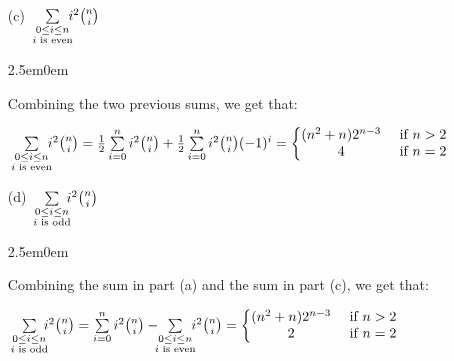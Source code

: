 \documentclass{book}
\newcommand{\exOne}{%
   \color{Purple}%
   \fontsize{13}{15}\selectfont%
}
\newenvironment{myIndent}{%
   \begin{adjustwidth}{2.5em}{0em}%
}{%
   \end{adjustwidth}%
}
\newcommand{\retTwo}{\hfill\bigbreak}
\begin{document}
\begin{enumerate}
\begin{myIndent}
      {\centering $\sum\limits_{i=0}^n i^2\binom{n}{i}(-1)^i = 2$ \newpage\par}
   \end{myIndent}

   \item[(c)] $\sum\limits_{
   \begin{smallmatrix}
      0 \leq i \leq n \\
      i \text{ is even}
   \end{smallmatrix}} \hspace{-0.6em}i^2\binom{n}{i}$

   \begin{myIndent}\exOne
      Combining the two previous sums, we get that:

      {\centering $\sum\limits_{
   \begin{smallmatrix}
      0 \leq i \leq n \\
      i \text{ is even}
   \end{smallmatrix}} \hspace{-0.6em}i^2\binom{n}{i} = \frac{1}{2}\sum\limits_{i=0}^n i^2\binom{n}{i} + \frac{1}{2}\sum\limits_{i=0}^n i^2\binom{n}{i}(-1)^i = \left\{
   \begin{matrix}
      (n^2 + n)2^{n-3} & \text{ if } n > 2 \\
      4 & \text{ if } n = 2
   \end{matrix}\right.$\retTwo\par}
   \end{myIndent}

   \item[(d)] $\sum\limits_{\begin{smallmatrix}
      0 \leq i \leq n \\
      i \text{ is odd}
   \end{smallmatrix}} \hspace{-0.6em}i^2\binom{n}{i}$

   \begin{myIndent}\exOne
      Combining the sum in part (a) and the sum in part (c), we get that:

      {\centering $\sum\limits_{
   \begin{smallmatrix}
      0 \leq i \leq n \\
      i \text{ is odd}
   \end{smallmatrix}} \hspace{-0.6em}i^2\binom{n}{i} = \sum\limits_{i=0}^n i^2\binom{n}{i} - \hspace{-0.6em} \sum\limits_{
      \begin{smallmatrix}
         0 \leq i \leq n \\
         i \text{ is even}
      \end{smallmatrix}} \hspace{-0.6em}i^2\binom{n}{i} = \left\{
   \begin{matrix}
      (n^2 + n)2^{n-3} & \text{ if } n > 2 \\
      2 & \text{ if } n = 2
   \end{matrix}\right.$\retTwo\par}
   \end{myIndent}
\end{enumerate}
\end{document}
